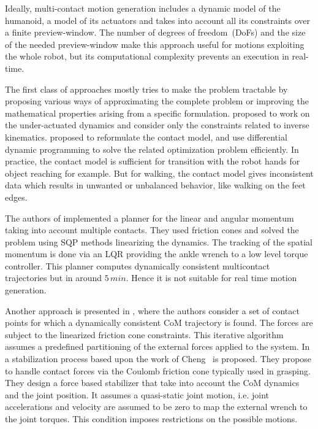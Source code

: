 Ideally, multi-contact motion generation includes a dynamic model of the humanoid, a model of its actuators and takes into account all its constraints over a finite preview-window.
The number of degrees of freedom~(DoFs) and the size of the needed preview-window make this approach useful for motions \cite{Koch2012a} exploiting the whole robot, but its computational complexity prevents an execution in real-time.

The first class of approaches mostly tries to make the problem tractable by proposing various ways of approximating the complete problem or improving the mathematical properties arising from a specific formulation.
\cite{Tedrake:ichr:2014} proposed to work on the under-actuated dynamics and consider only the constraints related to inverse kinematics.
\cite{Todorov:ICRA:2014} proposed to reformulate the contact model, and use differential dynamic programming to solve the related optimization problem efficiently.
In practice, the contact model is sufficient for transition with the robot hands for object reaching for example.
But for walking, the contact model gives inconsistent data which results in unwanted or unbalanced behavior, like walking on the feet edges.

The authors of \cite{herzog2015trajectory} implemented a planner for the linear and angular momentum taking into account multiple contacts.
They used friction cones and solved the problem using SQP methods linearizing the dynamics.
The tracking of the spatial momentum is done via an LQR providing the ankle wrench to a low level torque controller.
This planner computes dynamically consistent multicontact trajectories but in around $5\,min$.
Hence it is not suitable for real time motion generation.

Another approach is presented in \cite{Hirukawa:icra:2007}, where the authors consider a set of contact points for which a dynamically consistent CoM trajectory is found.
The forces are subject to the linearized friction cone constraints.
This iterative algorithm assumes a predefined partitioning of the external forces applied to the system.
In \cite{Ott:Humanoids:2011} a stabilization process based upon the work of Cheng~\cite{DBLP:journals/trob/HyonHC07} is proposed.
They propose to handle contact forces via the Coulomb friction cone typically used in grasping.
They design a force based stabilizer that take into account the CoM dynamics and the joint position.
It assumes a quasi-static joint motion, i.e. joint accelerations and velocity are assumed to be zero to map the external wrench to the joint torques.
This condition imposes restrictions on the possible motions.
%
%
%

